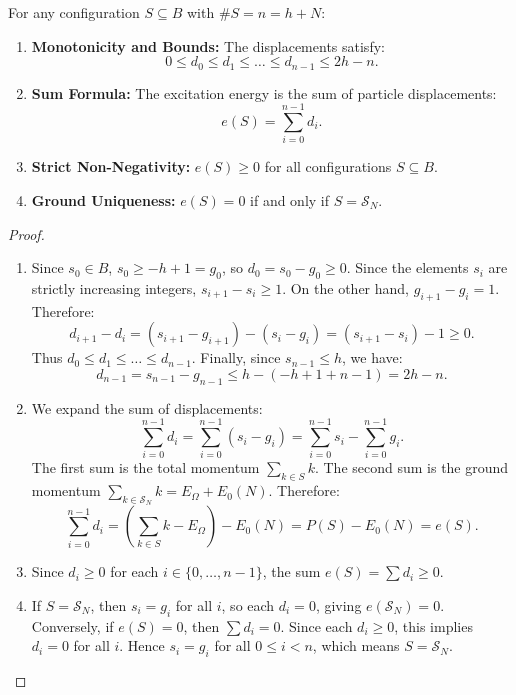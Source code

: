 \begin{theorem}
\label{thm:app_rank_formula}
For any configuration $S \subseteq B$ with $\#S = n = h + N$:
\begin{enumerate}
    \item \textbf{Monotonicity and Bounds:} The displacements satisfy:
    \begin{equation}
    0 \le d_0 \le d_1 \le \dots \le d_{n-1} \le 2h - n.
    \end{equation}
    \item \textbf{Sum Formula:} The excitation energy is the sum of particle displacements:
    \begin{equation}
    e(S) = \sum_{i=0}^{n-1} d_i.
    \end{equation}
    \item \textbf{Strict Non-Negativity:} $e(S) \ge 0$ for all configurations $S \subseteq B$.
    \item \textbf{Ground Uniqueness:} $e(S) = 0$ if and only if $S = \mathcal{S}_N$.
\end{enumerate}
\end{theorem}

\begin{proof}
\begin{enumerate}
    \item Since $s_0 \in B$, $s_0 \ge -h + 1 = g_0$, so $d_0 = s_0 - g_0 \ge 0$.
    Since the elements $s_i$ are strictly increasing integers, $s_{i+1} - s_i \ge 1$.
    On the other hand, $g_{i+1} - g_i = 1$. Therefore:
    \[
    d_{i+1} - d_i = (s_{i+1} - g_{i+1}) - (s_i - g_i) = (s_{i+1} - s_i) - 1 \ge 0.
    \]
    Thus $d_0 \le d_1 \le \dots \le d_{n-1}$.
    Finally, since $s_{n-1} \le h$, we have:
    \[
    d_{n-1} = s_{n-1} - g_{n-1} \le h - (-h + 1 + n - 1) = 2h - n.
    \]
    \item We expand the sum of displacements:
    \[
    \sum_{i=0}^{n-1} d_i = \sum_{i=0}^{n-1} (s_i - g_i) = \sum_{i=0}^{n-1} s_i - \sum_{i=0}^{n-1} g_i.
    \]
    The first sum is the total momentum $\sum_{k \in S} k$.
    The second sum is the ground momentum $\sum_{k \in \mathcal{S}_N} k = E_\Omega + E_0(N)$.
    Therefore:
    \[
    \sum_{i=0}^{n-1} d_i = \left(\sum_{k \in S} k - E_\Omega\right) - E_0(N) = P(S) - E_0(N) = e(S).
    \]
    \item Since $d_i \ge 0$ for each $i \in \{0, \dots, n-1\}$, the sum $e(S) = \sum d_i \ge 0$.
    \item If $S = \mathcal{S}_N$, then $s_i = g_i$ for all $i$, so each $d_i = 0$, giving $e(\mathcal{S}_N) = 0$.
    Conversely, if $e(S) = 0$, then $\sum d_i = 0$. Since each $d_i \ge 0$, this implies $d_i = 0$ for all $i$.
    Hence $s_i = g_i$ for all $0 \le i < n$, which means $S = \mathcal{S}_N$.
\end{enumerate}
\end{proof}

